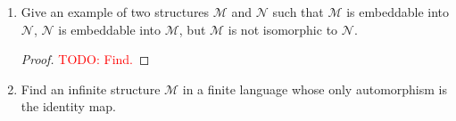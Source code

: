\documentclass{article}
\newcommand{\TODO}[1]{\textcolor{red}{TODO: #1}}
\begin{document}
\begin{enumerate}
\begin{enumerate}
      \item $\mathscr{M}=\langle\mathbb{N},\leq,\cdot,0\rangle$ and
        $\mathscr{N}=\langle\mathbb{N},\leq,+,0\rangle$
        \begin{proof}
          No such embedding exists. Assume that an embedding
          $\alpha:\mathbb{N}\hookrightarrow\mathbb{N}$ exists. Then
          $\alpha(0)=0$ since embeddings preserve constants. Embeddings
          should also preserve functions, so
          $\alpha(0)=\alpha(0\cdot1)=\alpha(0)+\alpha(1)=0+\alpha(1)=\alpha(1)$,
          which contradicts the injectiveness of $\alpha$.
        \end{proof}

      \item $\mathscr{M}=\langle\mathbb{N}\setminus\{0\},\cdot,1\rangle$ and
        $\mathscr{N}=\langle\mathbb{N},+,0\rangle$
        \begin{proof}
          No such embedding exists. Assume that an embedding
          $\alpha:\mathbb{N}\hookrightarrow\mathbb{N}$ exists. Since
          embeddings preserve function maps, we can prove by induction on
          $k$ that for any $n\in\mathbb{N}\setminus\{0\}$,
          $\alpha(n^k)=k\cdot \alpha(n)$.  Let $m=\alpha(2)$ and
          $n=\alpha(3)$. Note that $m\neq0$ and $n\neq0$ since
          $\alpha(1)=0$ and $\alpha$ is injective. Then $\alpha(2^n)=n\cdot
          m=m\cdot n=\alpha(3^m)$, yet $2^n\neq3^m$ since $m,n\neq0$,
          contradicting the injectiveness of $\alpha$.
        \end{proof}
    \end{enumerate}

  \item Give an example of two structures $\mathscr{M}$ and $\mathscr{N}$
    such that $\mathscr{M}$ is embeddable into $\mathscr{N}$, $\mathscr{N}$
    is embeddable into $\mathscr{M}$, but $\mathscr{M}$ is not isomorphic
    to $\mathscr{N}$.

    \begin{proof}
      \TODO{Find.}
    \end{proof}

  \item Find an infinite structure $\mathscr{M}$ in a finite language whose
    only automorphism is the identity map.


\end{enumerate}
\end{document}
